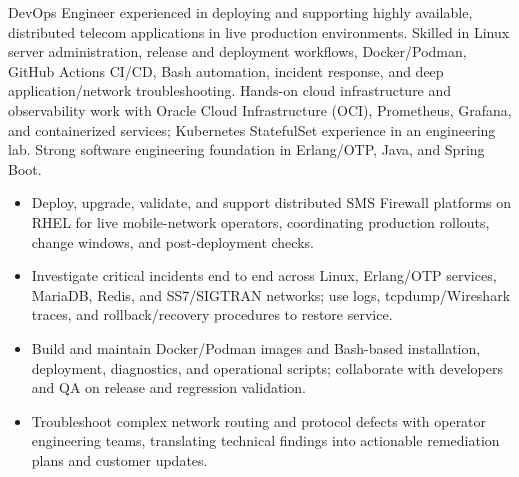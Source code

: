 DevOps Engineer experienced in deploying and supporting highly available, distributed telecom applications in live production environments. Skilled in Linux server administration, release and deployment workflows, Docker/Podman, GitHub Actions CI/CD, Bash automation, incident response, and deep application/network troubleshooting. Hands-on cloud infrastructure and observability work with Oracle Cloud Infrastructure (OCI), Prometheus, Grafana, and containerized services; Kubernetes StatefulSet experience in an engineering lab. Strong software engineering foundation in Erlang/OTP, Java, and Spring Boot.


\begin{itemize}
\item Deploy, upgrade, validate, and support distributed SMS Firewall platforms on RHEL for live mobile-network operators, coordinating production rollouts, change windows, and post-deployment checks.
\item Investigate critical incidents end to end across Linux, Erlang/OTP services, MariaDB, Redis, and SS7/SIGTRAN networks; use logs, tcpdump/Wireshark traces, and rollback/recovery procedures to restore service.
\item Build and maintain Docker/Podman images and Bash-based installation, deployment, diagnostics, and operational scripts; collaborate with developers and QA on release and regression validation.
\item Troubleshoot complex network routing and protocol defects with operator engineering teams, translating technical findings into actionable remediation plans and customer updates.
\end{itemize}

